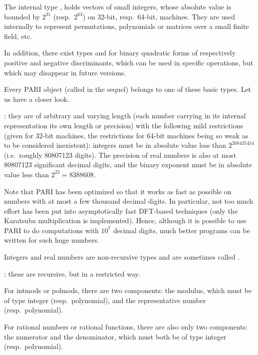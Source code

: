The internal type , holds vectors of small
integers, whose absolute value is bounded by $2^{31}$
(resp.~$2^{63}$) on 32-bit, resp.~64-bit, machines. They are used internally
to represent permutations, polynomials or matrices over a small finite field,
etc.

In addition, there exist types  and  for binary
quadratic forms of respectively positive and negative
discriminants, which can be used in specific
operations, but which may disappear in future versions.

Every PARI object (called  in the sequel) belongs to one of these
basic types. Let us have a closer look.

: they are of
arbitrary and varying length (each number carrying in its internal
representation its own length or precision) with the following mild
restrictions (given for 32-bit machines, the restrictions for 64-bit machines
being so weak as to be considered inexistent): integers must be in absolute
value less than $2^{268435454}$ (i.e.~roughly 80807123 digits). The
precision of real numbers is also at most 80807123 significant decimal
digits, and the binary exponent must be in absolute value less than
$2^{23}=8388608$.

Note that PARI has been optimized so that it works as fast as possible on
numbers with at most a few thousand decimal digits. In particular, not too
much effort has been put into asymptotically fast DFT-based techniques (only
the Karatsuba multiplication is implemented). Hence, although it is possible
to use PARI to do computations with $10^7$ decimal digits, much better
programs can be written for such huge numbers.

Integers and real numbers are non-recursive types and are sometimes called
.

:
 these are recursive, but in a restricted way.

For intmods or polmods, there are two components: the modulus, which must
be of type integer (resp.\ polynomial), and the representative number (resp.\
polynomial).

For rational numbers or rational functions, there are also only two
components: the numerator and the denominator, which must both be of type
integer (resp.\ polynomial).

